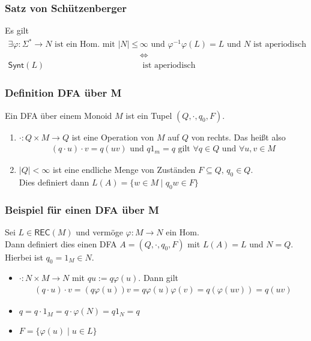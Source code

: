 \documentclass[12pt, german]{article}
\newcommand{\sigstern}{\Sigma^\ast}
\newcommand{\inv}{^{-1}}
\newcommand{\rec}{\mathsf{REC}}
\newcommand{\synt}{\mathsf{Synt}}
\begin{document}
	
	\subsubsection{Satz von Schützenberger}
	Es gilt 
	\begin{align*}
		\exists \varphi: \sigstern \to N \text{ ist ein Hom. mit } |N| \leq &\infty \text{ und } \varphi\inv\varphi(L) = L \text{ und $N$ ist aperiodisch} \\ 
		&\iff \\
		\synt(L) &\text{ ist aperiodisch}
	\end{align*}
	
	\subsubsection{Definition DFA über M}
	Ein DFA über einem Monoid $M$ ist ein Tupel $(Q, \cdot, q_0, F)$. 
	\begin{enumerate}[label=\arabic*)]
		\item $\cdot: Q \times M \to Q$ ist eine Operation von $M$ auf $Q$ von rechts. Das heißt also
		\begin{align*}
			(q \cdot u) \cdot v = q(uv) \text{ und } q1_m = q \text{ gilt } \forall q \in Q \text{ und } \forall u,v \in M
		\end{align*}
		\item $|Q| < \infty$ ist eine endliche Menge von Zuständen $F\subseteq Q,  \, q_0 \in Q$. \\
		Dies definiert dann $L(A) = \{w \in M \mid q_0w \in F\}$
	\end{enumerate}
	
	\subsubsection{Beispiel für einen DFA über M}
	Sei $L \in \rec(M)$ und vermöge $\varphi: M \to N$ ein Hom. \\ 
	Dann definiert dies einen DFA $A = (Q,\cdot, q_0, F)$ mit $L(A) = L$ und $N = Q$. 
	Hierbei ist $q_0 = 1_M \in N$. 
	\begin{itemize}
		\item $\cdot : N \times M \to N$ mit $qu := q\varphi(u)$. Dann gilt
		\begin{align*}
			(q \cdot u)\cdot v = (q\varphi(u))v = q \varphi(u)\varphi(v) = q(\varphi(uv)) = q(uv)
		\end{align*}
		\item $q = q \cdot 1_M = q \cdot \varphi(N) = q1_N = q$
		\item $F = \{\varphi(u) \mid u \in L \}$
	\end{itemize}
	
\end{document}
